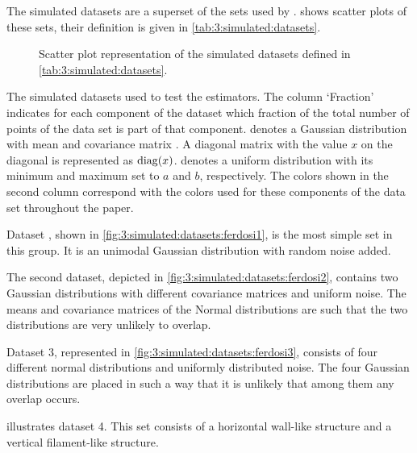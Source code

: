 
The simulated datasets are a superset of the sets used by \textcite{ferdosi2011comparison}.  shows scatter plots of these sets, their definition is given in \cref{tab:3:simulated:datasets}.

\begin{figure*}
	\centering
				
	\caption{Scatter plot representation of the simulated datasets defined in \cref{tab:3:simulated:datasets}. }
	\label{fig:3:simulated:datasets}
\end{figure*}

\begin{table*}
	\centering
	
	\caption{The simulated datasets used to test the estimators. The column `Fraction' indicates for each component of the dataset which fraction of the total number of points of the data set is part of that component. \gaussDist{\varMean}{\varCovarianceMatrix} denotes a Gaussian distribution with mean \varMean and covariance matrix \varCovarianceMatrix. A diagonal matrix with the value $x$ on the diagonal is represented as $\operatorname{diag}(x)$.  denotes a uniform distribution with its minimum and maximum set to $a$ and $b$, respectively. The colors shown in the second column correspond with the colors used for these components of the data set throughout the paper.} 	
	\label{tab:3:simulated:datasets}
\end{table*}

	Dataset \ferdosiOne, shown in \cref{fig:3:simulated:datasets:ferdosi1}, is the most simple set in this group. It is an unimodal Gaussian distribution with random noise added. 

	The second dataset, depicted in \cref{fig:3:simulated:datasets:ferdosi2}, contains two Gaussian distributions with different covariance matrices and uniform noise. The means and covariance matrices of the Normal distributions are such that the two distributions are very unlikely to overlap. 

	Dataset 3, represented in \cref{fig:3:simulated:datasets:ferdosi3}, consists of four different normal distributions and uniformly distributed noise. The four Gaussian distributions are placed in such a way that it is unlikely that among them any overlap occurs.

	 illustrates dataset 4. This set consists of a horizontal wall-like structure and a vertical filament-like structure. 

